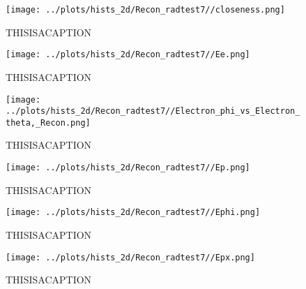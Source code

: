 \documentclass{article}
\begin{document}
\listoffigures
\clearpage
\begin{landscape}

    \begin{figure}[ht]
        \centering

        \texttt{[image: ../plots/hists\_2d/Recon\_radtest7//closeness.png]}
        \captionsetup{textformat=empty,labelformat=blank}
        \caption{THISISACAPTION}
    \end{figure}
    \clearpage
    
    \begin{figure}[ht]
        \centering

        \texttt{[image: ../plots/hists\_2d/Recon\_radtest7//Ee.png]}
        \captionsetup{textformat=empty,labelformat=blank}
        \caption{THISISACAPTION}
    \end{figure}
    \clearpage
    
    \begin{figure}[ht]
        \centering

        \texttt{[image: ../plots/hists\_2d/Recon\_radtest7//Electron\_phi\_vs\_Electron\_theta,\_Recon.png]}
        \captionsetup{textformat=empty,labelformat=blank}
        \caption{THISISACAPTION}
    \end{figure}
    \clearpage
    
    \begin{figure}[ht]
        \centering

        \texttt{[image: ../plots/hists\_2d/Recon\_radtest7//Ep.png]}
        \captionsetup{textformat=empty,labelformat=blank}
        \caption{THISISACAPTION}
    \end{figure}
    \clearpage
    
    \begin{figure}[ht]
        \centering

        \texttt{[image: ../plots/hists\_2d/Recon\_radtest7//Ephi.png]}
        \captionsetup{textformat=empty,labelformat=blank}
        \caption{THISISACAPTION}
    \end{figure}
    \clearpage
    
    \begin{figure}[ht]
        \centering

        \texttt{[image: ../plots/hists\_2d/Recon\_radtest7//Epx.png]}
        \captionsetup{textformat=empty,labelformat=blank}
        \caption{THISISACAPTION}
    \end{figure}
    \clearpage
    

\end{landscape}
\end{document}
